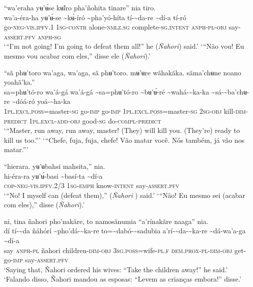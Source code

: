 \documentclass[output=paper,
modfonts,nonflat
]{langsci/langscibook}
\begin{document}
\ea  “wa'eraha yʉ’ʉ́se kʉ̃iro pha'ñohita tinare” nia tiro.\\[.3em]
\gll wa'a-éra-ha	yʉ’ʉ́-se	{\textasciitilde}kʉ́-író	{\textasciitilde}pha'yó-híta{\footnotemark}	tí-{\textasciitilde}da-re	{\textasciitilde}dí-a	tí-ró\\
     go\textsc{-neg-vis.ipfv.}1	1\textsc{sg-contr}	alone-\textsc{nmlz.sg}	complete\textsc{-sg.intent}	\textsc{anph-pl-obj}	say-\textsc{assert.pfv}	\textsc{anph-sg}\\
\glt ‘“I'm not going! I'm going to defeat them all!” he (\textit{Ñahori}) said.'
\glt‘“Não vou! Eu mesmo vou acabar com eles,” disse ele (\textit{Ñahori}).'
\z 

\ea “sã phʉ'toro wa'aga, wa'aga, sã phʉ'toro. mʉ'ʉre wãhakãka. sãma'chʉne noano yoahã'ka.”\\[.3em]
\gll {\textasciitilde}sa=phʉ'tó-ro	wa'á-gá	wa'á-gá	{\textasciitilde}sa=phʉ'tó-ro {\textasciitilde}bʉ'ʉ́-ré	{\textasciitilde}wahá-{\textasciitilde}ka-ka	{\textasciitilde}sá-{\textasciitilde}ba'chʉ-re	{\textasciitilde}dóá-ró	yoá-{\textasciitilde}ha{\footnotemark}-ka\\
     1\textsc{pl.excl.poss}=master\textsc{-sg}	go-\textsc{imp}	go-\textsc{imp}	1\textsc{pl.excl.poss}=master\textsc{-sg} 2\textsc{sg-obj}	kill-\textsc{dim-predict}	1\textsc{pl.excl-add-obj}	good\textsc{-sg}	do-\textsc{compl-predict}\\
\glt ‘“Master, run away, run away, master! (They) will kill you. (They're) ready to kill us too.”’
\glt ‘“Chefe, fuja, fuja, chefe! Vão matar você. Nós também, já vão nos matar.”’
\z 

\ea “hierara. yʉ’ʉbahsi mahsita,” nia.\\[.3em]
\gll hi-éra-ra	yʉ’ʉ́-basi	{\textasciitilde}basí-ta	{\textasciitilde}dí-a\\
     \textsc{cop-neg-vis.ipfv.}2/3	1\textsc{sg-emph}	know-\textsc{intent}	say-\textsc{assert.pfv}\\
\glt ‘“No! I myself can (defeat them),” (\textit{Ñahori} ) said.’
\glt ‘“Não! Eu mesmo sei (acabar com eles),” disse (\textit{Ñahori}).’
\z 

\ea ni, tina ñahori pho'nakãre, to namosãnumia “a’rínakãre naaga” nia.\\[.3em]
\gll {\textasciitilde}dí	tí-{\textasciitilde}da	ñáhórí	{\textasciitilde}pho'dá-{\textasciitilde}ka-re	to={\textasciitilde}dabó-{\textasciitilde}sadubia a’rí-{\textasciitilde}da-{\textasciitilde}ka-re	{\textasciitilde}dá-wa'a-ga	{\textasciitilde}dí-a\\
     say	\textsc{anph-pl}	ñahori	children\textsc{-dim-obj}	3\textsc{sg.poss}=wife-\textsc{pl.f} \textsc{dem.prox-pl-dim-obj}	get-go-\textsc{imp}	say-\textsc{assert.pfv}\\
\glt ‘Saying that, Ñahori ordered his wives: “Take the children away!” he said.’\\
\glt ‘Falando disso, Ñahori mandou as esposas: “Levem as crianças embora!” disse.’
\z 
\end{document}
